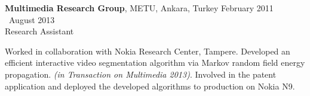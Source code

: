     \textbf{Multimedia Research Group}, METU, Ankara, Turkey \hfill February 2011 \textendash ~August 2013\vspace{0.5mm}\\\vspace{0mm}
	\hspace{-1mm}Research Assistant  \hfill \vspace{-5mm}\\\vspace{0mm}

	Worked in collaboration with Nokia Research Center, Tampere. Developed an efficient interactive video segmentation algorithm via Markov random field energy propagation. \emph{(in Transaction on Multimedia 2013)}.	Involved in the patent application and deployed the developed algorithms to production on Nokia N9.
